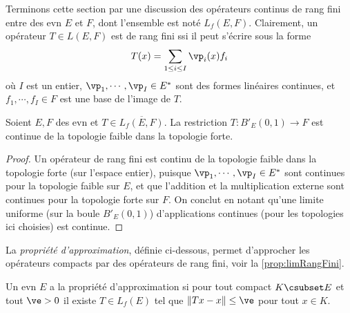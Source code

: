 


Terminons cette section par une discussion des opérateurs continus de rang fini entre des evn $E$ et $F$, dont l'ensemble est noté $L_f(E,F)$. Clairement, un opérateur $T \in L(E,F)$ est de rang fini ssi il peut s'écrire sous la forme 
\begin{equation}
\label{eq:rgFini}
	T(x) = \sum_{1 \leq i \leq I} \vp_i(x) f_i
\end{equation}
où $I$ est un entier, $\vp_1,\cdots,\vp_I \in E^*$ sont des formes linéaires continues, et $f_1,\cdots,f_I \in F$ est une base de l'image de $T$.



\begin{proposition}
	Soient $E,F$ des evn et $T \in \overline{L_f(E,F)}$. La restriction $T : B'_E(0,1)\to F$ est continue de la topologie faible dans la topologie forte. 	
\end{proposition}

\begin{proof}
	Un opérateur de rang fini est continu de la topologie faible dans la topologie forte (sur l'espace entier), puisque $\vp_1,\cdots,\vp_I \in E^*$ sont continues pour la topologie faible sur $E$, et que l'addition et la multiplication externe sont continues pour la topologie forte sur $F$. On conclut en notant qu'une limite uniforme (sur la boule $B'_E(0,1)$) d'applications continues (pour les topologies ici choisies) est continue. 
\end{proof}

La \emph{propriété d'approximation}, définie ci-dessous, permet d'approcher les opérateurs compacts par des opérateurs de rang fini, voir la \cref{prop:limRangFini}.

\begin{definition}
\label{def:propriApprox}
	Un evn $E$ a la propriété d'approximation si pour tout compact $K \csubset E$ et tout $\ve>0$ il existe $T \in L_f(E)$ tel que $\|T x-x\| \leq \ve$ pour tout $x \in K$. 
\end{definition}

